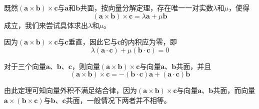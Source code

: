 既然$(\bm{a}\times\bm{b})\times\bm{c}$与$\bm{a}$和$\bm{b}$共面，按向量分解定理，存在唯一一对实数$\lambda$和$\mu$，使得
\[ (\bm{a}\times\bm{b})\times\bm{c}=\lambda \bm{a} + \mu \bm{b} \]
成立，我们来尝试具体求出$\lambda$和$\mu$。

因为$(\bm{a}\times\bm{b})\times\bm{c}$与$\bm{c}$垂直，因此它与$\bm{c}$的内积应为零，即
\[ \lambda (\bm{a} \cdot \bm{c}) + \mu (\bm{b} \cdot \bm{c}) = 0 \]

\begin{theorem}
  对于三个向量$\bm{a}$、$\bm{b}$、$\bm{c}$，则向量$(\bm{a}\times\bm{b})\times\bm{c}$与向量$\bm{a}$、$\bm{b}$共面，并且
  \[ (\bm{a}\times\bm{b})\times\bm{c} = -(\bm{b}\cdot\bm{c})\bm{a}+(\bm{a}\cdot\bm{c})\bm{b} \]
\end{theorem}

由此定理可知向量外积不满足结合律，因为$(\bm{a}\times\bm{b})\times\bm{c}$与向量$\bm{a}$、$\bm{b}$共面，而向量$\bm{a}\times(\bm{b}\times\bm{c})$与$\bm{b}$、$\bm{c}$共面，一般情况下两者并不相等。


